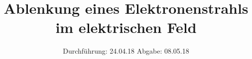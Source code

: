

\subject{V501}
\title{Ablenkung eines Elektronenstrahls im elektrischen Feld}
\date{
  Durchführung: 24.04.18
  \hspace{3em}
  Abgabe: 08.05.18
}



\maketitle
\thispagestyle{empty}
\tableofcontents
\newpage








\newpage
\printbibliography


